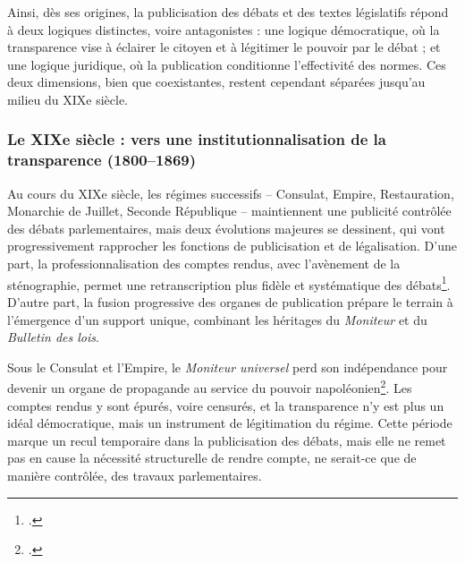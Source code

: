 Ainsi, dès ses origines, la publicisation des débats et des textes législatifs répond à deux logiques distinctes, voire antagonistes : une logique démocratique, où la transparence vise à éclairer le citoyen et à légitimer le pouvoir par le débat ; et une logique juridique, où la publication conditionne l’effectivité des normes. Ces deux dimensions, bien que coexistantes, restent cependant séparées jusqu’au milieu du XIXe siècle.

\subsubsection{Le XIXe siècle : vers une institutionnalisation de la transparence (1800–1869)}

Au cours du XIXe siècle, les régimes successifs – Consulat, Empire, Restauration, Monarchie de Juillet, Seconde République – maintiennent une publicité contrôlée des débats parlementaires, mais deux évolutions majeures se dessinent, qui vont progressivement rapprocher les fonctions de publicisation et de légalisation. D’une part, la professionnalisation des comptes rendus, avec l’avènement de la sténographie, permet une retranscription plus fidèle et systématique des débats\footcite[][]{gardey}. D’autre part, la fusion progressive des organes de publication prépare le terrain à l’émergence d’un support unique, combinant les héritages du \emph{Moniteur} et du \emph{Bulletin des lois}.

Sous le Consulat et l’Empire, le \emph{Moniteur universel} perd son indépendance pour devenir un organe de propagande au service du pouvoir napoléonien\footcite[][]{universalis}. Les comptes rendus y sont épurés, voire censurés, et la transparence n’y est plus un idéal démocratique, mais un instrument de légitimation du régime. Cette période marque un recul temporaire dans la publicisation des débats, mais elle ne remet pas en cause la nécessité structurelle de rendre compte, ne serait-ce que de manière contrôlée, des travaux parlementaires. 

